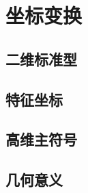 \section{坐标变换}
\label{b2:sec:0803}


\subsection{二维标准型}
\label{b2:subsec:080301}

\subsection{特征坐标}
\label{b2:subsec:080302}

\subsection{高维主符号}
\label{b2:subsec:080303}

\subsection{几何意义}
\label{b2:subsec:080304}


